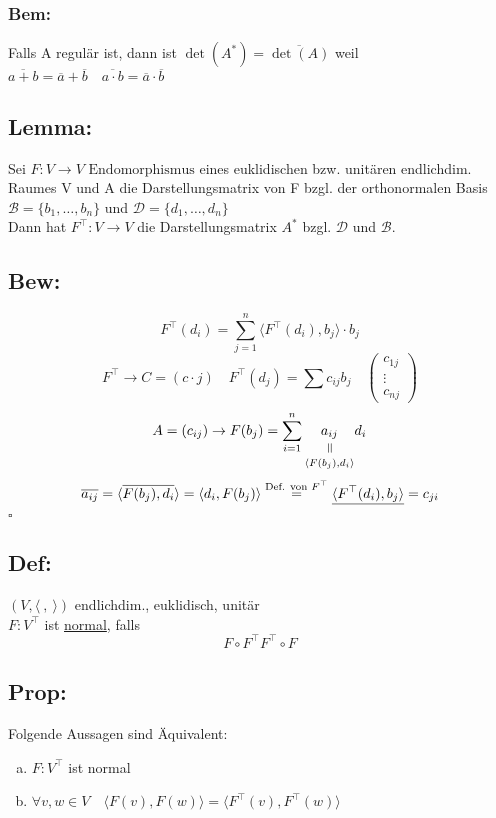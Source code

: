 \documentclass[titlepage,12pt,a4paper,ngerman]{report}
\newenvironment{bew}{\subsection{Bew:}}{\hfill$\square$}
\newcommand{\Bew}[1]{\begin{bew}#1\end{bew}}
\newcommand{\verteq}{\rotatebox{90}{$\,=$}}
\newcommand{\equalto}[2]{\underset{\scriptstyle\overset{\mkern4mu\verteq}{#2}}{#1}}
\newcommand{\tx}[1]{\textrm{#1}}
\newcommand{\basis}[3]{\{#1_{#2}, \dots, #1_{#3}\}}
\newcommand{\summ}[2]{\sum_{#1}^{#2}}
\newcommand{\enph}{F: V \to V \textrm{ Endomorphismus}}
\begin{document}
\subsubsection{Bem:}
Falls A regulär ist, dann ist $ \det(A^*) = \overline{\det(A)} $ weil $ \overline{a+b} = \overline{a} + \overline{b} \quad \overline{a \cdot b} = \overline{a} \cdot \overline{b} $
\subsection{Lemma:}
Sei $ \enph $ eines euklidischen bzw. unitären endlichdim. Raumes V und A die Darstellungsmatrix von F bzgl. der orthonormalen Basis $ \mathcal{B} = \basis{b}{1}{n} $ und $ \mathcal{D} = \basis{d}{1}{n} $\\
Dann hat $ F^\top: V \to V $ die Darstellungsmatrix $ A^* $ bzgl. $ \mathcal{D} $ und $ \mathcal{B} $.
\Bew{$$F^\top (d_i) = \summ{j=1}{n} \langle F^\top (d_i), b_j \rangle \cdot b_j$$
	$$F^\top \to C = (c \cdot j) \quad F^\top (d_j) = \sum c_{ij} b_j \quad \begin{pmatrix}
	c_{1j} \\ \vdots \\ c_{nj}\end{pmatrix}$$
	$$A= (c_{ij}) \to F(b_j) = \summ{i = 1}{n} \equalto{a_{ij}}{\langle F(b_j),d_i\rangle} d_i$$
	$$\overline{a_{ij}} = \langle \overline{F(b_j), d_i} \rangle = \langle d_i, F(b_j) \rangle \buildrel{\tx{Def. von }F^\top} \over = \underline{\langle F^\top (d_i),b_j \rangle} = c_{ji}$$
}
\subsection{Def:}
$ (V,\langle\ ,\ \rangle) $ endlichdim., euklidisch, unitär\\
$ F:V^\top $ ist \underline{normal}, falls
$$F \circ F^\top  F^\top \circ F $$ 
\subsection{Prop:}
Folgende Aussagen sind Äquivalent:
\begin{enumerate}[a)]
	\item $ F:V^\top $ ist normal
	\item $ \forall v, w \in V \quad \langle F(v) , F(w) \rangle = \langle F^\top(v) , F^\top(w) \rangle $
\end{enumerate}
\end{document}
